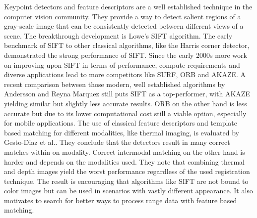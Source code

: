 Keypoint detectors and feature descriptors are a well established technique in the computer vision community.
They provide a way to detect salient regions of a gray-scale image that can be consistently detected between different views of a scene.
The breakthrough development is Lowe's SIFT\cite{lowe_ijcv04} algorithm.
The early benchmark\cite{mikolajczyk_pami2005} of SIFT to other classical algorithms, like the Harris corner detector\cite{harris_1988}, demonstrated the strong performance of SIFT.
Since the early 2000s more work on improving upon SIFT in terms of performance, compute requirements and diverse applications lead to more competitors like SURF\cite{bay_eccv06}, ORB\cite{rublee_iccv11} and AKAZE\cite{alcantarilla_bmva13}.
A recent comparison between those modern, well established algorithms by Andersson and Reyna Marquez\cite{andersson_2016} still puts SIFT as a top-performer, with AKAZE\cite{alcantarilla_bmva13} yielding similar but slightly less accurate results.
ORB\cite{rublee_iccv11} on the other hand is less accurate but due to its lower computational cost still a viable option, especially for mobile applications.
The use of classical feature descriptors and template based matching for different modalities, like thermal imaging, is evaluated by Gesto-Diaz et al.\cite{gesto-diaz_2017}.
They conclude that the detectors result in many correct matches within on modality.
Correct intermodal matching on the other hand is harder and depends on the modalities used.
They note that combining thermal and depth images yield the worst performance regardless of the used registration technique.
The result is encouraging that algorithms like SIFT\cite{lowe_ijcv04} are not bound to color images but can be used in scenarios with vastly different appearance.
It also motivates to search for better ways to process range data with feature based matching.
